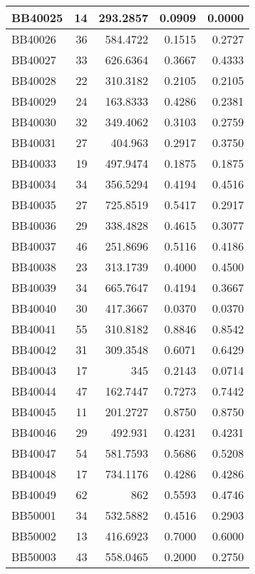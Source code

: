 \begin{longtable}{|l|r|r||r|r|}
	\hline
	BB40025 & 14    & 293.2857 & 0.0909 & 0.0000 \\
	\hline
	BB40026 & 36    & 584.4722 & 0.1515 & 0.2727 \\
	\hline
	BB40027 & 33    & 626.6364 & 0.3667 & 0.4333 \\
	\hline
	BB40028 & 22    & 310.3182 & 0.2105 & 0.2105 \\
	\hline
	BB40029 & 24    & 163.8333 & 0.4286 & 0.2381 \\
	\hline
	BB40030 & 32    & 349.4062 & 0.3103 & 0.2759 \\
	\hline
	BB40031 & 27    & 404.963 & 0.2917 & 0.3750 \\
	\hline
	BB40033 & 19    & 497.9474 & 0.1875 & 0.1875 \\
	\hline
	BB40034 & 34    & 356.5294 & 0.4194 & 0.4516 \\
	\hline
	BB40035 & 27    & 725.8519 & 0.5417 & 0.2917 \\
	\hline
	BB40036 & 29    & 338.4828 & 0.4615 & 0.3077 \\
	\hline
	BB40037 & 46    & 251.8696 & 0.5116 & 0.4186 \\
	\hline
	BB40038 & 23    & 313.1739 & 0.4000 & 0.4500 \\
	\hline
	BB40039 & 34    & 665.7647 & 0.4194 & 0.3667 \\
	\hline
	BB40040 & 30    & 417.3667 & 0.0370 & 0.0370 \\
	\hline
	BB40041 & 55    & 310.8182 & 0.8846 & 0.8542 \\
	\hline
	BB40042 & 31    & 309.3548 & 0.6071 & 0.6429 \\
	\hline
	BB40043 & 17    & 345   & 0.2143 & 0.0714 \\
	\hline
	BB40044 & 47    & 162.7447 & 0.7273 & 0.7442 \\
	\hline
	BB40045 & 11    & 201.2727 & 0.8750 & 0.8750 \\
	\hline
	BB40046 & 29    & 492.931 & 0.4231 & 0.4231 \\
	\hline
	BB40047 & 54    & 581.7593 & 0.5686 & 0.5208 \\
	\hline
	BB40048 & 17    & 734.1176 & 0.4286 & 0.4286 \\
	\hline
	BB40049 & 62    & 862   & 0.5593 & 0.4746 \\
	\hline
	BB50001 & 34    & 532.5882 & 0.4516 & 0.2903 \\
	\hline
	BB50002 & 13    & 416.6923 & 0.7000 & 0.6000 \\
	\hline
	BB50003 & 43    & 558.0465 & 0.2000 & 0.2750 \\

\end{longtable}
